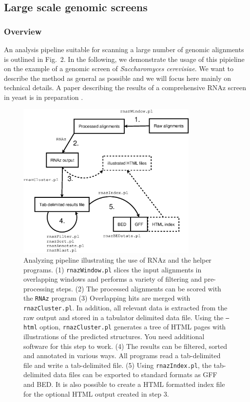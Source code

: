 \documentclass[11pt]{article}
\begin{document}
\subsection{Large scale genomic screens}
\label{sec:large-scale-genomic}

\subsubsection{Overview}

An analysis pipeline suitable for scanning a large number of genomic
alignments is outlined in Fig.~2. In the following, we demonstrate the
usage of this pipieline on the example of a genomic screen of
\emph{Saccharomyces cerevisiae}. We want to describe the method as general
as possible and we will focus here mainly on technical details. A paper
describing the results of a comprehensive RNAz screen in yeast is in
preparation \cite{steigele06}.

\begin{figure}
  \centerline{\includegraphics*[width=0.8\textwidth]{figs/flowchart.eps}}

  \caption{Analyzing pipeline illustrating the use of RNAz and the helper
    programs.  (1) \texttt{rnazWindow.pl} slices the input alignments in
    overlapping windows and performs a variety of filtering and
    pre-processing steps. (2) The processed alignments can be scored with the
    \texttt{RNAz} program (3) Overlapping hits are merged with
    \texttt{rnazCluster.pl}. In addition, all relevant data is extracted from
    the raw output and stored in a tabulator delimited data file. Using the
    \texttt{--html} option, \texttt{rnazCluster.pl} generates a tree of HTML
    pages with illustrations of the predicted structures. You need additional
    software for this step to work. (4) The results can be filtered, sorted
    and annotated in various ways. All programs read a tab-delimited file and
    write a tab-delimited file. (5) Using \texttt{rnazIndex.pl}, the
    tab-delimited data files can be exported to standard formats as GFF and
    BED. It is also possible to create a HTML formatted index file for the
    optional HTML output created in step 3.}
\end{figure}
\end{document}
